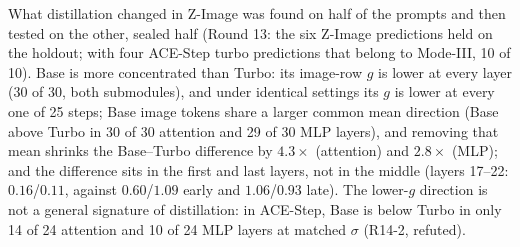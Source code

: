 \documentclass[11pt]{article}
\begin{document}

What distillation changed in Z-Image was found on half of the prompts and then tested on the other, sealed half (Round 13: the six Z-Image predictions held on the holdout; with four ACE-Step turbo predictions that belong to Mode-III, 10 of 10). Base is more concentrated than Turbo: its image-row $g$ is lower at every layer (30 of 30, both submodules), and under identical settings its $g$ is lower at every one of 25 steps; Base image tokens share a larger common mean direction (Base above Turbo in 30 of 30 attention and 29 of 30 MLP layers), and removing that mean shrinks the Base--Turbo difference by $4.3\times$ (attention) and $2.8\times$ (MLP); and the difference sits in the first and last layers, not in the middle (layers 17--22: $0.16$/$0.11$, against $0.60$/$1.09$ early and $1.06$/$0.93$ late). The lower-$g$ direction is not a general signature of distillation: in ACE-Step, Base is below Turbo in only 14 of 24 attention and 10 of 24 MLP layers at matched $\sigma$ (R14-2, refuted).
\end{document}

